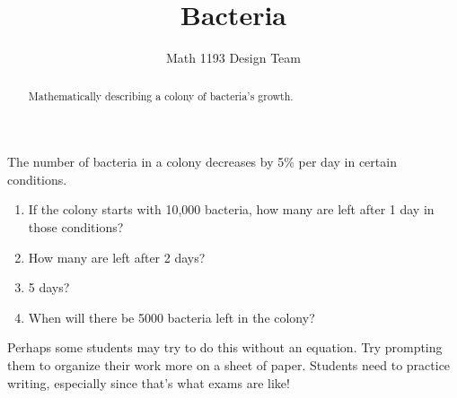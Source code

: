 \documentclass[noauthor,noinstructornotes]{ximera}
\title{Bacteria}
\author{Math 1193 Design Team}
\begin{document}
\begin{abstract}
    Mathematically describing a colony of bacteria's growth.
\end{abstract}
\maketitle

The number of bacteria in a colony decreases by 5\% per day in certain conditions.

\begin{enumerate}
    \item If the colony starts with 10,000 bacteria, how many are left
    after 1 day in those conditions?
    \item How many are left after 2 days?
    \item 5 days?
    \item When will there be 5000 bacteria left in the colony?
\end{enumerate}

\begin{instructorNotes}
Perhaps some students may try to do this without an equation. Try 
prompting them to organize their work more on a sheet of paper.
Students need to practice writing, especially since that's what exams 
are like!
\end{instructorNotes}
\end{document}
